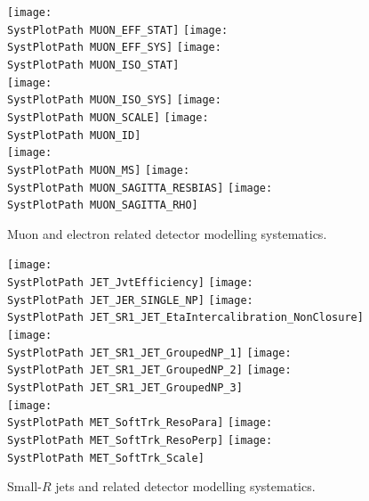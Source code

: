 \begin{figure}[!h]
\begin{center}
\texttt{[image: \\SystPlotPath MUON\_EFF\_STAT]}        
\texttt{[image: \\SystPlotPath MUON\_EFF\_SYS]}          
\texttt{[image: \\SystPlotPath MUON\_ISO\_STAT]}      \\
\texttt{[image: \\SystPlotPath MUON\_ISO\_SYS]}    
\texttt{[image: \\SystPlotPath MUON\_SCALE]}         
\texttt{[image: \\SystPlotPath MUON\_ID]}           \\      
\texttt{[image: \\SystPlotPath MUON\_MS]}            
\texttt{[image: \\SystPlotPath MUON\_SAGITTA\_RESBIAS]}    
\texttt{[image: \\SystPlotPath MUON\_SAGITTA\_RHO]}     
\caption{Muon and electron related detector modelling systematics.}
\label{fig:systplots_lepton}
\end{center}
\end{figure}


\begin{figure}[!h]
\begin{center}
\texttt{[image: \\SystPlotPath JET\_JvtEfficiency]}
\texttt{[image: \\SystPlotPath JET\_JER\_SINGLE\_NP]}
\texttt{[image: \\SystPlotPath JET\_SR1\_JET\_EtaIntercalibration\_NonClosure]}\\
\texttt{[image: \\SystPlotPath JET\_SR1\_JET\_GroupedNP\_1]}
\texttt{[image: \\SystPlotPath JET\_SR1\_JET\_GroupedNP\_2]}
\texttt{[image: \\SystPlotPath JET\_SR1\_JET\_GroupedNP\_3]}\\
\texttt{[image: \\SystPlotPath MET\_SoftTrk\_ResoPara]}  
\texttt{[image: \\SystPlotPath MET\_SoftTrk\_ResoPerp]}  
\texttt{[image: \\SystPlotPath MET\_SoftTrk\_Scale]}    \\   
\caption{Small-$R$ jets and \met related detector modelling systematics.}
\label{fig:systplots_smallr_met}
\end{center}
\end{figure}

